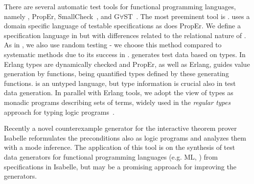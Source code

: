There are several automatic test tools for functional programming
languages, namely \QuickCheck, {\sf PropEr}, {\sf SmallCheck}~\cite{runciman2008smallcheck},
and G$\forall$ST~\cite{koopman2003gast}.
The %
most preeminent tool is \QuickCheck{}.
%
\QuickCheck{} uses a domain specific language of testable specifications
as does {\sf PropEr}.
%
We define a specification language in \plqc{} but with
differences related to the relational nature of \Prolog{}.%
As in \QuickCheck{}, we also use random testing - we choose this method
compared to systematic methods due to its success in \QuickCheck{}.
%
\QuickCheck{} generates test data %
based
on \Haskell{} types.
In {\sf Erlang} types are dynamically checked and {\sf PropEr}, as well
as {\sf Erlang}\QuickCheck{}, guides value generation by functions,
being quantified types defined by these generating functions.
%
\Prolog{} is an untyped language, but type information is crucial also in
\plqc{} test data generation.
%
In parallel with {\sf Erlang} tools, we adopt the view of types as
monadic \Prolog{} programs describing sets of terms, widely used in the
{\em regular types} approach for typing logic programs~\cite{Yardeni:1991:TSL:110703.110705,fruhwirth1991logic,DBLP:conf/iclp/Zobel87,florido1992types}.


Recently a novel counterexample generator for the interactive theorem
prover Isabelle \cite{bulwahn2012smart} reformulates the preconditions
also as logic programs and analyzes them with a mode inference.
%
The application of this tool is on the  synthesis of test data
generators for functional programming languages (e.g. ML, \Haskell) from
specifications in Isabelle, %
but may be a promising approach for improving the generators.

